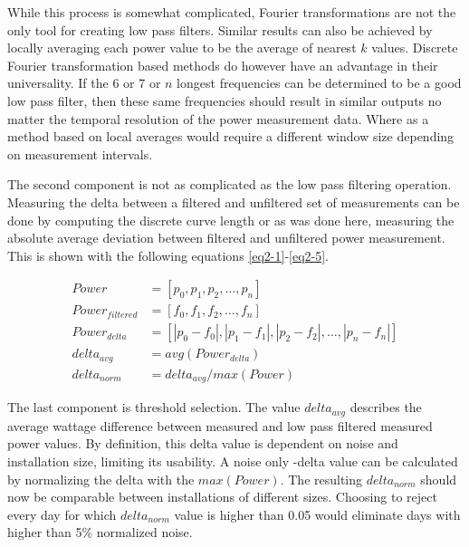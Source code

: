 
While this process is somewhat complicated, Fourier transformations are not the only tool for creating low pass filters. Similar results can also be achieved by locally averaging each power value to be the average of nearest $k$ values. Discrete Fourier transformation based methods do however have an advantage in their universality. If the 6 or 7 or $n$ longest frequencies can be determined to be a good low pass filter, then these same frequencies should result in similar outputs no matter the temporal resolution of the power measurement data. Where as a method based on local averages would require a different window size depending on measurement intervals.

The second component is not as complicated as the low pass filtering operation. Measuring the delta between a filtered and unfiltered set of measurements can be done by computing the discrete curve length or as was done here, measuring the absolute average deviation between filtered and unfiltered power measurement. This is shown with the following equations \ref{eq2-1}-\ref{eq2-5}.


\begin{align}
Power &= [p_0, p_1, p_2, \dots , p_n]   \label{eq2-1}\\ 
Power_{filtered} &= [f_0, f_1, f_2, \dots , f_n] \\
Power_{delta} &= [|p_0 - f_0|, |p_1-f_1|, |p_2-f_2|, \dots , |p_n-f_n|] \\
delta_{avg} &= avg(Power_{delta}) \\
delta_{norm} &= delta_{avg}/ max(Power) \label{eq2-5}
\end{align}


The last component is threshold selection. The value $delta_{avg}$ describes the average wattage difference between measured and low pass filtered measured power values. By definition, this delta value is dependent on noise and installation size, limiting its usability. A noise only -delta value can be calculated by normalizing the delta with the $max(Power)$. The resulting $delta_{norm}$ should now be comparable between installations of different sizes. Choosing to reject every day for which $delta_{norm}$ value is higher than 0.05 would eliminate days with higher than 5\% normalized noise.


